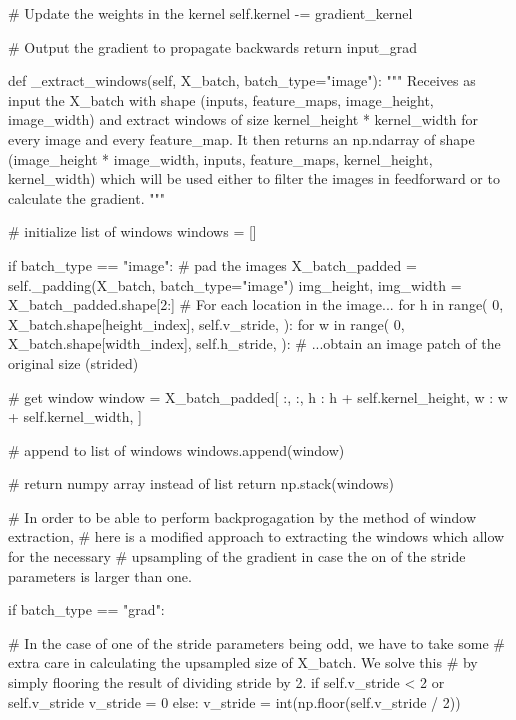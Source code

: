 \documentclass[%
oneside,                 %
final,                   %
10pt]{article}
\begin{document}
        # Update the weights in the kernel
        self.kernel -= gradient_kernel

        # Output the gradient to propagate backwards
        return input_grad

    def _extract_windows(self, X_batch, batch_type="image"):
        """
        Receives as input the X_batch with shape (inputs, feature_maps, image_height, image_width)
        and extract windows of size kernel_height * kernel_width for every image and every feature_map.
        It then returns an np.ndarray of shape (image_height * image_width, inputs, feature_maps, kernel_height, kernel_width)
        which will be used either to filter the images in feedforward or to calculate the gradient.
        """

        # initialize list of windows
        windows = []

        if batch_type == "image":
            # pad the images
            X_batch_padded = self._padding(X_batch, batch_type="image")
            img_height, img_width = X_batch_padded.shape[2:]
            # For each location in the image...
            for h in range(
                0,
                X_batch.shape[height_index],
                self.v_stride,
            ):
                for w in range(
                    0,
                    X_batch.shape[width_index],
                    self.h_stride,
                ):
                    # ...obtain an image patch of the original size (strided)

                    # get window
                    window = X_batch_padded[
                        :,
                        :,
                        h : h + self.kernel_height,
                        w : w + self.kernel_width,
                    ]

                    # append to list of windows
                    windows.append(window)

            # return numpy array instead of list
            return np.stack(windows)

        # In order to be able to perform backprogagation by the method of window extraction,
        # here is a modified approach to extracting the windows which allow for the necessary
        # upsampling of the gradient in case the on of the stride parameters is larger than one.

        if batch_type == "grad":

            # In the case of one of the stride parameters being odd, we have to take some
            # extra care in calculating the upsampled size of X_batch. We solve this
            # by simply flooring the result of dividing stride by 2.
            if self.v_stride < 2 or self.v_stride %
                v_stride = 0
            else:
                v_stride = int(np.floor(self.v_stride / 2))
\end{document}
